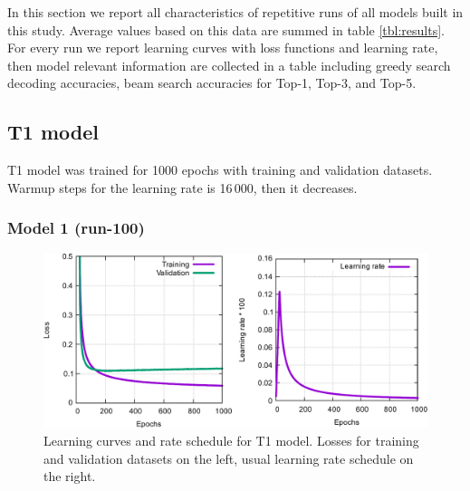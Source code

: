 \documentclass{article}
\begin{document}
In this section we report all characteristics of repetitive runs of all models built in this study. Average values based on this data are summed in table \ref{tbl:results}. For every run we report learning curves with loss functions and learning rate, then model relevant information are collected in a table including greedy search decoding accuracies, beam search accuracies for Top-1, Top-3, and Top-5.

\subsection{T1 model} 
T1 model was trained for 1000 epochs with training and validation datasets. Warmup steps for the learning rate is 16\,000, then it decreases.

\subsubsection{Model 1 (run-100)}
  
\begin{figure}[h!]
  \centering
  \includegraphics[width = 16.5cm]{images/t1-1.pdf}
  \caption{Learning curves and rate schedule for T1 model. Losses for training and validation datasets on the left, usual learning rate schedule on the right.}
  \label{fig:t11}
\end{figure}
\end{document}
